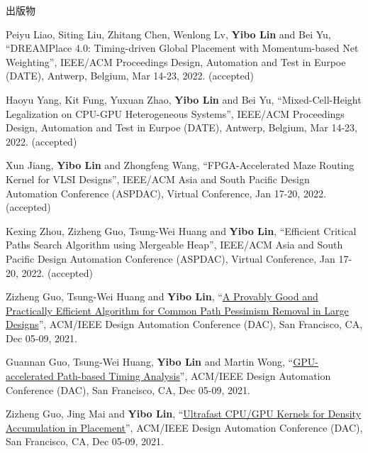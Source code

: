 \begin{rSection}{出版物}
\begin{description}[font=\normalfont]
\item[{[C58]}]{
        Peiyu Liao, Siting Liu, Zhitang Chen, Wenlong Lv, \textbf{Yibo Lin} and Bei Yu, 
    ``DREAMPlace 4.0: Timing-driven Global Placement with Momentum-based Net Weighting'', 
    IEEE/ACM Proceedings Design, Automation and Test in Eurpoe (DATE), Antwerp, Belgium, Mar 14-23, 2022.
    (accepted)
}
            

\item[{[C57]}]{
        Haoyu Yang, Kit Fung, Yuxuan Zhao, \textbf{Yibo Lin} and Bei Yu, 
    ``Mixed-Cell-Height Legalization on CPU-GPU Heterogeneous Systems'', 
    IEEE/ACM Proceedings Design, Automation and Test in Eurpoe (DATE), Antwerp, Belgium, Mar 14-23, 2022.
    (accepted)
}
            

\item[{[C56]}]{
        Xun Jiang, \textbf{Yibo Lin} and Zhongfeng Wang, 
    ``FPGA-Accelerated Maze Routing Kernel for VLSI Designs'', 
    IEEE/ACM Asia and South Pacific Design Automation Conference (ASPDAC), Virtual Conference, Jan 17-20, 2022.
    (accepted)
}
            

\item[{[C55]}]{
        Kexing Zhou, Zizheng Guo, Tsung-Wei Huang and \textbf{Yibo Lin}, 
    ``Efficient Critical Paths Search Algorithm using Mergeable Heap'', 
    IEEE/ACM Asia and South Pacific Design Automation Conference (ASPDAC), Virtual Conference, Jan 17-20, 2022.
    (accepted)
}
            

\item[{[C54]}]{
        Zizheng Guo, Tsung-Wei Huang and \textbf{Yibo Lin}, 
    ``\href{https://doi.org/10.1109/DAC18074.2021.9586085}{A Provably Good and Practically Efficient Algorithm for Common Path Pessimism Removal in Large Designs}'', 
    ACM/IEEE Design Automation Conference (DAC), San Francisco, CA, Dec 05-09, 2021.
    
}
            

\item[{[C53]}]{
        Guannan Guo, Tsung-Wei Huang, \textbf{Yibo Lin} and Martin Wong, 
    ``\href{https://doi.org/10.1109/DAC18074.2021.9586316}{GPU-accelerated Path-based Timing Analysis}'', 
    ACM/IEEE Design Automation Conference (DAC), San Francisco, CA, Dec 05-09, 2021.
    
}
            

\item[{[C52]}]{
        Zizheng Guo, Jing Mai and \textbf{Yibo Lin}, 
    ``\href{https://doi.org/10.1109/DAC18074.2021.9586149}{Ultrafast CPU/GPU Kernels for Density Accumulation in Placement}'', 
    ACM/IEEE Design Automation Conference (DAC), San Francisco, CA, Dec 05-09, 2021.
    
}
\end{description}
\end{rSection}
